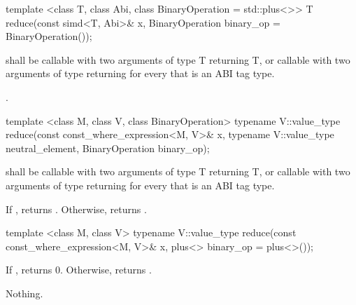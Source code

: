 \begin{itemdecl}
template <class T, class Abi, class BinaryOperation = std::plus<>>
T reduce(const simd<T, Abi>& x, BinaryOperation binary_op = BinaryOperation());
\end{itemdecl}
\begin{itemdescr}
  \pnum\requires {} shall be callable with two arguments of type \type T returning \type T, or callable with two arguments of type \simd[<T, A1>] returning \simd[<T, A1>] for every  that is an ABI tag type.

  \pnum\returns {} \foralli.

  \pnum{}
\end{itemdescr}

\begin{itemdecl}
template <class M, class V, class BinaryOperation>
typename V::value_type reduce(const const_where_expression<M, V>& x, typename V::value_type neutral_element,
                              BinaryOperation binary_op);
\end{itemdecl}
\begin{itemdescr}
  \pnum\requires {} shall be callable with two arguments of type \type T returning \type T, or callable with two arguments of type \simd[<T, A1>] returning \simd[<T, A1>] for every  that is an ABI tag type.

  \pnum\returns
  If , returns .
  Otherwise, returns  .

  \pnum{}
\end{itemdescr}

\begin{itemdecl}
template <class M, class V>
typename V::value_type reduce(const const_where_expression<M, V>& x, plus<> binary_op = plus<>());
\end{itemdecl}
\begin{itemdescr}
  \pnum\returns
  If , returns 0.
  Otherwise, returns  .

  \pnum\throws Nothing.
\end{itemdescr}

